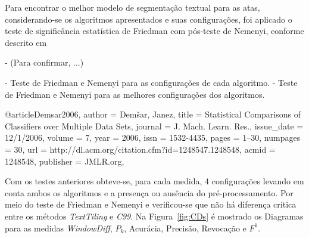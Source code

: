 Para encontrar o melhor modelo de segmentação textual para as atas, considerando-se os algoritmos apresentados e suas configurações, foi aplicado o teste de significância estatística de Friedman com pós-teste de Nemenyi, conforme descrito em 


- (Para confirmar, ...)

- Teste de Friedman e Nemenyi para as configurações de cada algoritmo.
- Teste de Friedman e Nemenyi para as melhores configurações dos algoritmos.










 
@article{Demsar2006,
 author = {Dem\v{s}ar, Janez},
 title = {Statistical Comparisons of Classifiers over Multiple Data Sets},
 journal = {J. Mach. Learn. Res.},
 issue_date = {12/1/2006},
 volume = {7},
 year = {2006},
 issn = {1532-4435},
 pages = {1--30},
 numpages = {30},
 url = {http://dl.acm.org/citation.cfm?id=1248547.1248548},
 acmid = {1248548},
 publisher = {JMLR.org},
} 





Com os testes anteriores obteve-se, para cada medida, 4 configurações levando em conta ambos os algoritmos e a presença ou ausência do pré-processamento. Por meio do teste de Friedman e Nemenyi e verificou-se que não há diferença crítica entre os métodos \textit{TextTiling} e \textit{C99}. Na Figura~\ref{fig:CDs} é mostrado os Diagramas para as medidas \textit{WindowDiff}, $P_k$, Acurácia, Precisão, Revocação e $F^1$.	












